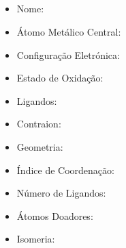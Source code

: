 \documentclass[12pt]{article}
\begin{document}
\noindent\begin{minipage}{\textwidth}
	
	\subsection{\ch{}}
	\begin{itemize}
   \item Nome:
   	
   
   \item Átomo Metálico Central:
   	
   	
   \item Configuração Eletrónica:
   
   
   \item Estado de Oxidação:
   
   
   \item Ligandos:
   
   
   \item Contraion:
   
   
   \item Geometria:
   
   
   \item Índice de Coordenação: 
   
   
   \item Número de Ligandos:
   
   
   \item Átomos Doadores:
   
   
   \item Isomeria:
	\end{itemize}
	
\end{minipage}
\end{document}
